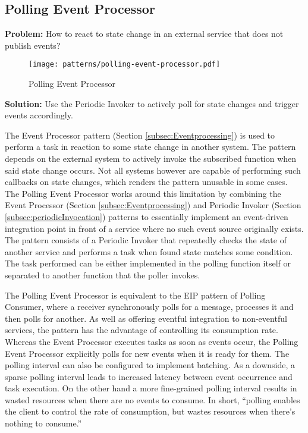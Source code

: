 \subsection{Polling Event Processor} \label{subsec:PollingEventProcessor}

\textbf{Problem:} How to react to state change in an external service that does not publish events?

\begin{figure}[h]
  \centering
  \texttt{[image: patterns/polling-event-processor.pdf]}
  \caption{Polling Event Processor}
  \label{fig:PollingEventProcessor}
\end{figure}

\textbf{Solution:} Use the Periodic Invoker to actively poll for state changes and trigger events accordingly.

The Event Processor pattern (Section \ref{subsec:Eventprocessing}) is used to perform a task in reaction to some state change in another system. The pattern depends on the external system to actively invoke the subscribed function when said state change occurs. Not all systems however are capable of performing such callbacks on state changes, which renders the pattern unusable in some cases. The Polling Event Processor works around this limitation by combining the Event Processor (Section \ref{subsec:Eventprocessing}) and Periodic Invoker (Section \ref{subsec:periodicInvocation}) patterns to essentially implement an event-driven integration point in front of a service where no such event source originally exists. The pattern consists of a Periodic Invoker that repeatedly checks the state of another service and performs a task when found state matches some condition. The task performed can be either implemented in the polling function itself or separated to another function that the poller invokes.

The Polling Event Processor is equivalent to the EIP pattern of Polling Consumer, where a receiver synchronously polls for a message, processes it and then polls for another. As well as offering eventful integration to non-eventful services, the pattern has the advantage of controlling its consumption rate. Whereas the Event Processor executes tasks as soon as events occur, the Polling Event Processor explicitly polls for new events when it is ready for them. The polling interval can also be configured to implement batching. As a downside, a sparse polling interval leads to increased latency between event occurrence and task execution. On the other hand a more fine-grained polling interval results in wasted resources when there are no events to consume. In short, ``polling enables the client to control the rate of consumption, but wastes resources when there’s nothing to consume.'' \parencite{hohpe2004enterprise}

